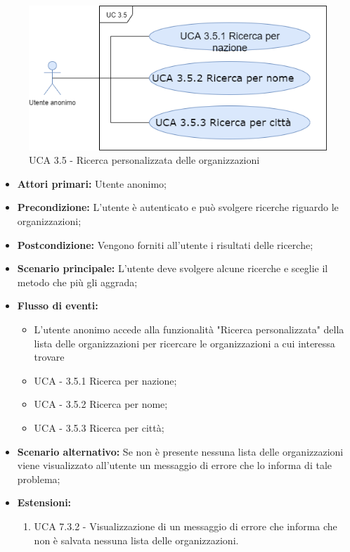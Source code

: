 \begin{figure}[h]
	\centering
	
	\includegraphics[scale=0.5]{sezioni/UseCase/Immagini/UCA3.5.png}
	\caption{UCA 3.5 - Ricerca personalizzata delle organizzazioni}
\end{figure}

\begin{itemize}
	\item \textbf{Attori primari:} Utente anonimo;
	\item \textbf{Precondizione:} L'utente è autenticato e può svolgere ricerche riguardo le organizzazioni;
	\item \textbf{Postcondizione:} Vengono forniti all'utente i risultati delle ricerche;
	\item \textbf{Scenario principale:} L'utente deve svolgere alcune ricerche e sceglie il metodo che più gli aggrada;
	\item \textbf{Flusso di eventi:} 
	\begin{itemize}
		\item L'utente anonimo accede alla funzionalità "Ricerca personalizzata" della lista delle organizzazioni per ricercare le organizzazioni a cui interessa trovare
		\item UCA - 3.5.1 Ricerca per nazione;
		\item UCA - 3.5.2 Ricerca per nome;
		\item UCA - 3.5.3 Ricerca per città;
	\end{itemize}
	\item \textbf{Scenario alternativo:} Se non è presente nessuna lista delle organizzazioni viene visualizzato all'utente un messaggio di errore che lo informa di tale problema;
	\item \textbf{Estensioni:}
	\begin{enumerate}
		\item UCA 7.3.2 - Visualizzazione di un messaggio di errore che informa che non è salvata nessuna lista delle organizzazioni.
	\end{enumerate}
\end{itemize}

